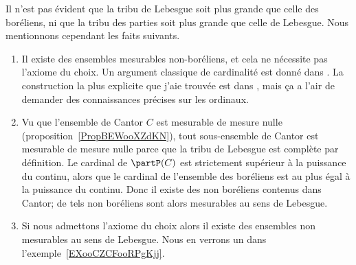 \begin{remark}
	Il n'est pas évident que la tribu de Lebesgue soit plus grande que celle des boréliens, ni que la tribu des parties soit plus grande que celle de Lebesgue. Nous mentionnons cependant les faits suivants.
	\begin{enumerate}
		\item
		      Il existe des ensembles mesurables non-boréliens, et cela ne nécessite pas l'axiome du choix. Un argument classique de cardinalité est donné dans \cite{SFYoobgQUp}. La construction la plus explicite que j'aie trouvée est dans \cite{XSHoosgoQa}, mais ça a l'air de demander des connaissances précises sur les ordinaux.
		\item
		      Vu que l'ensemble de Cantor \( C\) est mesurable de mesure nulle (proposition~\ref{PropBEWooXZdKN}), tout sous-ensemble de Cantor est mesurable de mesure nulle parce que la tribu de Lebesgue est complète par définition. Le cardinal de \( \partP(C)\) est strictement supérieur à la puissance du continu, alors que le cardinal de l'ensemble des boréliens est au plus égal à la puissance du continu. Donc il existe des non boréliens contenus dans Cantor; de tels non boréliens sont alors mesurables au sens de Lebesgue.

		\item
		      Si nous admettons l'axiome du choix alors il existe des ensembles non mesurables au sens de Lebesgue. Nous en verrons un dans l'exemple~\ref{EXooCZCFooRPgKjj}.
	\end{enumerate}
\end{remark}

